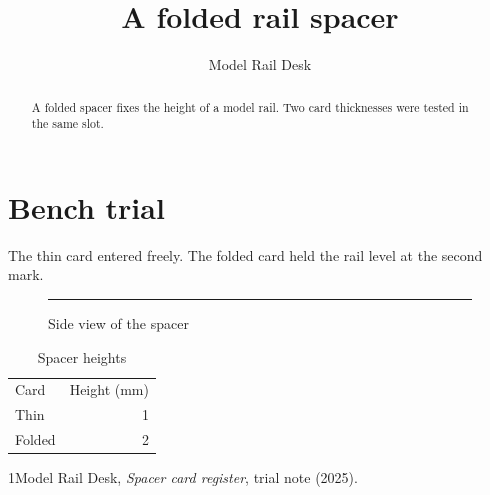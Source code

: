 \documentclass[manuscript,nonacm]{acmart}
\begin{document}
\title{A folded rail spacer}\author{Model Rail Desk}\begin{abstract}A folded spacer fixes the height of a model rail. Two card thicknesses were tested in the same slot.\end{abstract}\maketitle
\section{Bench trial}
The thin card entered freely. The folded card held the rail level at the second mark.
\begin{figure}[ht]\centering\rule{28mm}{2mm}\caption{Side view of the spacer}\end{figure}
\begin{table}[ht]\centering\begin{tabular}{lr}Card&Height (mm)\\Thin&1\\Folded&2\end{tabular}\caption{Spacer heights}\end{table}
\begin{thebibliography}{1}Model Rail Desk, \emph{Spacer card register}, trial note (2025).\end{thebibliography}
\end{document}
